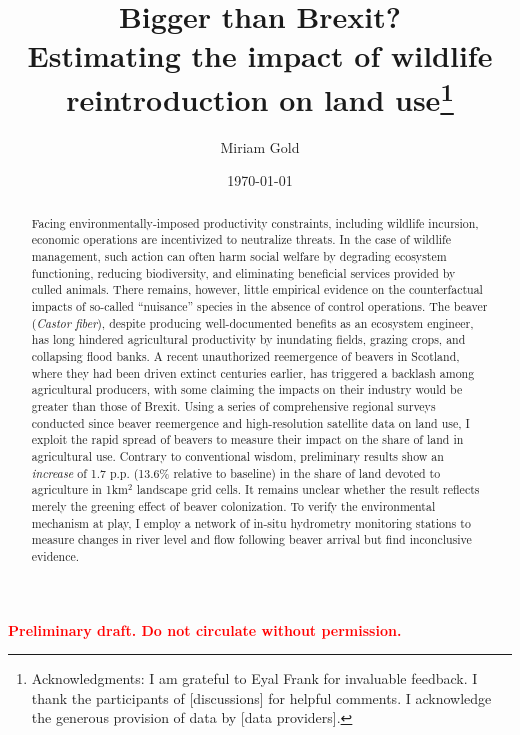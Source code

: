 \documentclass[11pt, english, letterpaper]{article}
\begin{document}
\justifying


\vspace{-2em} 

\title{Bigger than Brexit? \\ Estimating the impact of wildlife reintroduction on land use\thanks{Acknowledgments: I am grateful to Eyal Frank for invaluable feedback. I thank the participants of [discussions] for helpful comments. I acknowledge the generous provision of data by [data providers].}}

\author[1]{\small Miriam Gold}

\date{\today}
\maketitle

\begin{center}
\vspace{-3em}
\textbf{\textcolor{red}{Preliminary draft. Do not circulate without permission.}}
\end{center}

\begin{abstract}
    \singlespacing 
    Facing environmentally-imposed productivity constraints, including wildlife incursion, economic operations are incentivized to neutralize threats. In the case of wildlife management, such action can often harm social welfare by degrading ecosystem functioning, reducing biodiversity, and eliminating beneficial services provided by culled animals. There remains, however, little empirical evidence on the counterfactual impacts of so-called ``nuisance'' species in the absence of control operations. The beaver (\textit{Castor fiber}), despite producing well-documented benefits as an ecosystem engineer, has long hindered agricultural productivity by inundating fields, grazing crops, and collapsing flood banks. A recent unauthorized reemergence of beavers in Scotland, where they had been driven extinct centuries earlier, has triggered a backlash among agricultural producers, with some claiming the impacts on their industry would be greater than those of Brexit. Using a series of comprehensive regional surveys conducted since beaver reemergence and high-resolution satellite data on land use, I exploit the rapid spread of beavers to measure their impact on the share of land in agricultural use. Contrary to conventional wisdom, preliminary results show an \textit{increase} of 1.7 p.p. (13.6\% relative to baseline) in the share of land devoted to agriculture in 1km$^2$ landscape grid cells. It remains unclear whether the result reflects merely the greening effect of beaver colonization. To verify the environmental mechanism at play, I employ a network of in-situ hydrometry monitoring stations to measure changes in river level and flow following beaver arrival but find inconclusive evidence.
\end{abstract}
\end{document}
